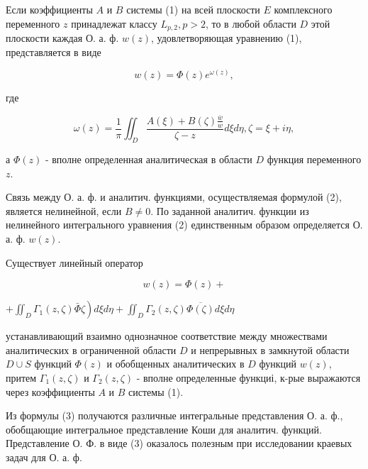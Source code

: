 \documentclass[10pt]{article}
\begin{document}
Если коэффициенты $A$ и $B$ системы (1) на всей плоскости $E$ комплексного переменного $z$ принадлежат классу $L_{p, 2}, p>2$, то в любой области $D$ этой плоскости каждая О. а. ф. $w(z)$, удовлетворяющая уравнению (1), представляется в виде



\[

w(z)=\Phi(z) e^{\omega(z)},

\]



где



\[

\omega(z)=\frac{1}{\pi} \iint_{D} \frac{A(\xi)+B(\zeta) \frac{\bar{w}}{w}}{\zeta-z} d \xi d \eta, \zeta=\xi+i \eta,

\]



а $\Phi(z)$ - вполне определенная аналитическая в области $D$ функция переменного $z$.



Связь между О. а. ф. и аналитич. функциями, осуществляемая формулой (2), является нелинейной, если $B \neq 0$. По заданной аналитич. функции из нелинейного интегрального уравнения (2) единственным образом определяется О. а. ф. $w(z)$.



Существует линейный оператор



\[

w(z)=\Phi(z)+

\]



$\left.+\iint_{D} \Gamma_{1}(z, \zeta) \bar{\Phi} \zeta\right) d \xi d \eta+\iint_{D} \Gamma_{2}(z, \zeta) \overline{\Phi(\zeta)} d \xi d \eta$



устанавливающий взаимно однозначное соответствие между множествами аналитических в ограниченной области $D$ и непрерывных в замкнутой области $D \cup S$ функций $\Phi(z)$ и обобщенных аналитических в $D$ функций $w(z)$, притем $\Gamma_{1}(z, \zeta)$ и $\Gamma_{2}(z, \zeta)$ - вполне определенные функциі, к-рые выражаются через коэффициенты $A$ и $B$ системы (1).



Из формулы (3) получаются различные интегральные представления О. а. ф., обобщающие интегральное представление Коши для аналитич. функций. Представление О. Ф. в виде (3) оказалось полезным при исследовании краевых задач для О. а. ф.
\end{document}

